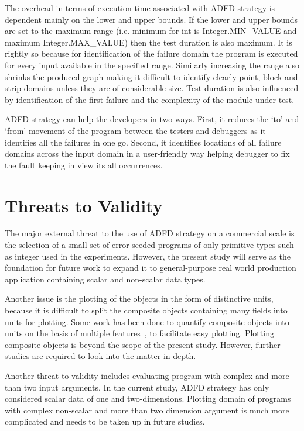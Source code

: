 The overhead in terms of execution time associated with ADFD strategy is dependent mainly on the lower and upper bounds. If the lower and upper bounds are set to the maximum range (i.e. minimum for int is Integer.MIN\_VALUE and maximum Integer.MAX\_VALUE) then the test duration is also maximum. It is rightly so because for identification of the failure domain the program is executed for every input available in the specified range. Similarly increasing the range also shrinks the produced graph making it difficult to identify clearly point, block and strip domains unless they are of considerable size. Test duration is also influenced by identification of the first failure and the complexity of the module under test.

ADFD strategy can help the developers in two ways. First, it reduces the `to' and `from' movement of the program between the testers and debuggers as it identifies all the failures in one go. Second, it identifies locations of all failure domains across the input domain in a user-friendly way helping debugger to fix the fault keeping in view its all occurrences.


\section{Threats to Validity} \label{sec:validity}
The major external threat to the use of ADFD strategy on a commercial scale is the selection of a small set of error-seeded programs of only primitive types such as integer used in the experiments. However, the present study will serve as the foundation for future work to expand it to general-purpose real world production application containing scalar and non-scalar data types.

Another issue is the plotting of the objects in the form of distinctive units, because it is difficult to split the composite objects containing many fields into units for plotting. Some work has been done to quantify composite objects into units on the basis of multiple features~\cite{ciupa2006object}, to facilitate easy plotting. Plotting composite objects is beyond the scope of the present study. However, further studies are required to look into the matter in depth. 

Another threat to validity includes evaluating program with complex and more than two input arguments. In the current study, ADFD strategy has only considered scalar data of one and two-dimensions. Plotting domain of programs with complex non-scalar and more than two dimension argument is much more complicated and needs to be taken up in future studies.

